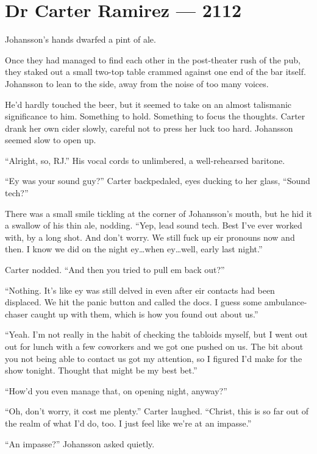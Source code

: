 \hypertarget{dr-carter-ramirez-2112}{%
\chapter*{Dr Carter Ramirez — 2112}\label{dr-carter-ramirez-2112}}

Johansson's hands dwarfed a pint of ale.

Once they had managed to find each other in the post-theater rush of the pub, they staked out a small two-top table crammed against one end of the bar itself. Johansson to lean to the side, away from the noise of too many voices.

He'd hardly touched the beer, but it seemed to take on an almost talismanic significance to him. Something to hold. Something to focus the thoughts. Carter drank her own cider slowly, careful not to press her luck too hard. Johansson seemed slow to open up.

``Alright, so, RJ.'' His vocal cords to unlimbered, a well-rehearsed baritone.

``Ey was your sound guy?'' Carter backpedaled, eyes ducking to her glass, ``Sound tech?''

There was a small smile tickling at the corner of Johansson's mouth, but he hid it a swallow of his thin ale, nodding. ``Yep, lead sound tech. Best I've ever worked with, by a long shot. And don't worry. We still fuck up eir pronouns now and then. I know we did on the night ey\ldots{}when ey\ldots{}well, early last night.''

Carter nodded. ``And then you tried to pull em back out?''

``Nothing. It's like ey was still delved in even after eir contacts had been displaced. We hit the panic button and called the docs. I guess some ambulance-chaser caught up with them, which is how you found out about us.''

``Yeah. I'm not really in the habit of checking the tabloids myself, but I went out out for lunch with a few coworkers and we got one pushed on us. The bit about you not being able to contact us got my attention, so I figured I'd make for the show tonight. Thought that might be my best bet.''

``How'd you even manage that, on opening night, anyway?''

``Oh, don't worry, it cost me plenty.'' Carter laughed. ``Christ, this is so far out of the realm of what I'd do, too. I just feel like we're at an impasse.''

``An impasse?'' Johansson asked quietly.

